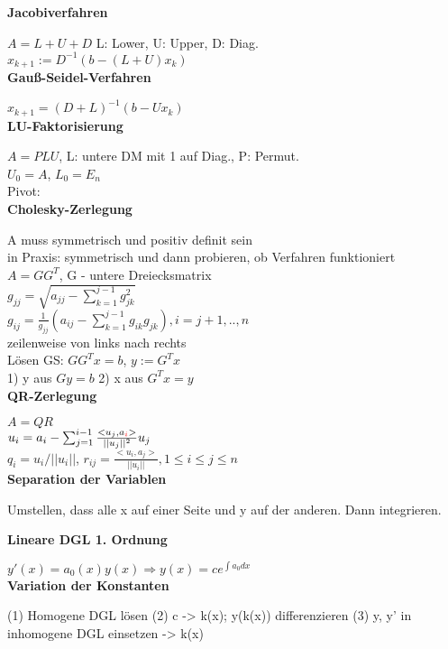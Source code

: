 \documentclass[10pt,twocolumn,a4paper]{article}
\begin{document}
\begin{flushleft}
\textbf{Jacobiverfahren}

$A = L + U + D$ L: Lower, U: Upper, D: Diag.\\
$x_{k+1} := D^{-1}(b-(L+U)x_k)$\\

\textbf{Gauß-Seidel-Verfahren}

$x_{k+1} = (D+L)^{-1} (b-Ux_k)$\\

\textbf{LU-Faktorisierung}

$A = PLU$, L: untere DM mit 1 auf Diag., P: Permut.\\
$U_0 = A$, $L_0 = E_n$\\
Pivot: \\

\textbf{Cholesky-Zerlegung}

A muss symmetrisch und positiv definit sein\\
in Praxis: symmetrisch und dann probieren, ob Verfahren funktioniert\\
$A = GG^T$, G - untere Dreiecksmatrix\\
$g_{jj} = \sqrt{a_{jj} - \sum_{k=1}^{j-1} g_{jk}^2}$\\
$g_{ij} = \frac{1}{g_{jj}} (a_{ij} - \sum_{k=1}^{j-1} g_{ik}g_{jk}), i=j+1,..,n$\\
zeilenweise von links nach rechts\\
Lösen GS: $GG^Tx=b$, $y:=G^Tx$\\
1) y aus $Gy=b$ 2) x aus $G^Tx=y$\\

\textbf{QR-Zerlegung}

$A = QR$\\
$u_i = a_i - \sum_{j=1}^{i-1} \frac{<u_j, a_{\textcolor{red}{i}}>}{||u_j||^2}u_j$\\
$q_i = u_i / ||u_i||$, $r_{ij} = \frac{<u_i, a_j>}{||u_i||}, 1 \leq i \leq j \leq n$\\

\textbf{Separation der Variablen}

Umstellen, dass alle x auf einer Seite und y auf der anderen. Dann integrieren.

\textbf{Lineare DGL 1. Ordnung}

$y'(x)=a_0(x)y(x) \Rightarrow y(x) = ce^{\int{a_0}dx}$\\

\textbf{Variation der Konstanten}

(1) Homogene DGL lösen (2) c -> k(x); y(k(x)) differenzieren (3) y, y' in inhomogene DGL einsetzen -> k(x)\\


\end{flushleft}
\end{document}
